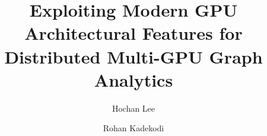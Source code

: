 \documentclass[sigplan,10pt,screen]{acmart}
\begin{document}
\title{Exploiting Modern GPU Architectural Features for Distributed Multi-GPU Graph Analytics}         %



\author{Hochan Lee}

\author{Rohan Kadekodi}
\end{document}
